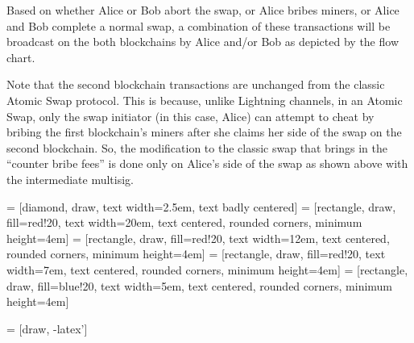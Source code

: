 Based on whether Alice or Bob abort the swap, or Alice bribes miners, or Alice and Bob complete a normal swap, a combination of these transactions will be broadcast on the both blockchains by Alice and/or Bob as depicted by the flow chart.

Note that the second blockchain transactions are unchanged from the classic Atomic Swap protocol. This is because, unlike Lightning channels, in an Atomic Swap, only the swap initiator (in this case, Alice) can attempt to cheat by bribing the first blockchain's miners after she claims her side of the swap on the second blockchain. So, the modification to the classic swap that brings in the ``counter bribe fees'' is done only on Alice's side of the swap as shown above with the intermediate multisig.

 = [diamond, draw, 
    text width=2.5em, text badly centered]
 = [rectangle, draw, fill=red!20, 
    text width=20em, text centered, rounded corners, minimum height=4em]
 = [rectangle, draw, fill=red!20, 
    text width=12em, text centered, rounded corners, minimum height=4em]
 = [rectangle, draw, fill=red!20, 
    text width=7em, text centered, rounded corners, minimum height=4em]
 = [rectangle, draw, fill=blue!20, 
    text width=5em, text centered, rounded corners, minimum height=4em]

 = [draw, -latex']

